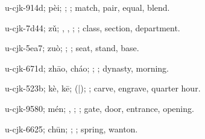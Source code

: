\begin{multicols}{2}
{\cjkgGlue{}u-cjk-914d; pèi; \cjkgGlue{}\cjkgGlue{}\cjkgGlue{}; \cjkgGlue{}; match, pair, equal, blend.

\cjkgGlue{}u-cjk-7d44; zǔ; \cjkgGlue{}\cjkgGlue{}\cjkgGlue{}, \cjkgGlue{}, \cjkgGlue{}; \cjkgGlue{}; class, section, department.

\cjkgGlue{}u-cjk-5ea7; zuò; \cjkgGlue{}\cjkgGlue{}\cjkgGlue{}; \cjkgGlue{}; seat, stand, base.

\cjkgGlue{}u-cjk-671d; zhāo, cháo; \cjkgGlue{}; \cjkgGlue{}; dynasty, morning.

\cjkgGlue{}u-cjk-523b; kè, kē; \cjkgGlue{}\cjkgGlue{}(\cjkgGlue{}|\cjkgGlue{}); \cjkgGlue{}; carve, engrave, quarter hour.

\cjkgGlue{}u-cjk-9580; mén; \cjkgGlue{}, \cjkgGlue{}; \cjkgGlue{}; gate, door, entrance, opening.

\cjkgGlue{}u-cjk-6625; chūn; \cjkgGlue{}; \cjkgGlue{}; spring, wanton.

}
\end{multicols}
